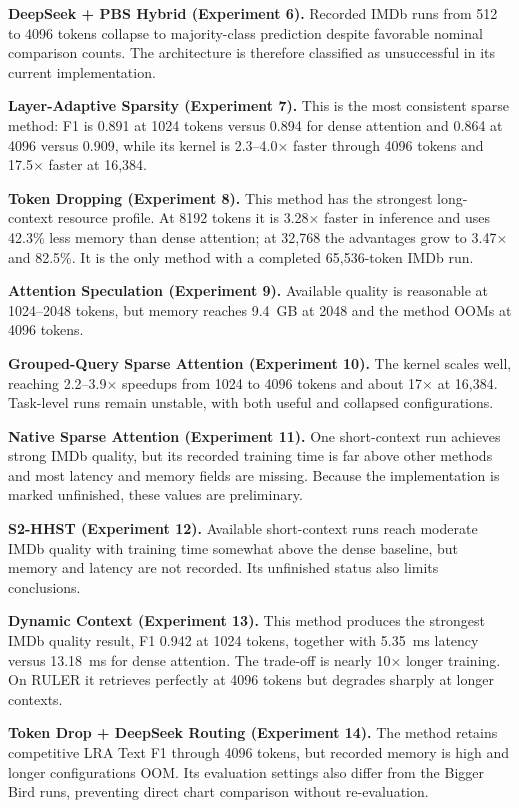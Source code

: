 \documentclass[11pt]{article}
\begin{document}
\textbf{DeepSeek + PBS Hybrid (Experiment 6).} Recorded IMDb runs from 512 to
4096 tokens collapse to majority-class prediction despite favorable nominal
comparison counts. The architecture is therefore classified as unsuccessful
in its current implementation.

\textbf{Layer-Adaptive Sparsity (Experiment 7).} This is the most consistent
sparse method: F1 is 0.891 at 1024 tokens versus 0.894 for dense attention and
0.864 at 4096 versus 0.909, while its kernel is 2.3--4.0$\times$ faster through
4096 tokens and 17.5$\times$ faster at 16{,}384.

\textbf{Token Dropping (Experiment 8).} This method has the strongest
long-context resource profile. At 8192 tokens it is 3.28$\times$ faster in
inference and uses 42.3\% less memory than dense attention; at 32{,}768 the
advantages grow to 3.47$\times$ and 82.5\%. It is the only method with a
completed 65{,}536-token IMDb run.

\textbf{Attention Speculation (Experiment 9).} Available quality is
reasonable at 1024--2048 tokens, but memory reaches 9.4~GB at 2048 and the
method OOMs at 4096 tokens.

\textbf{Grouped-Query Sparse Attention (Experiment 10).} The kernel scales
well, reaching 2.2--3.9$\times$ speedups from 1024 to 4096 tokens and about
17$\times$ at 16{,}384. Task-level runs remain unstable, with both useful and
collapsed configurations.

\textbf{Native Sparse Attention (Experiment 11).} One short-context run
achieves strong IMDb quality, but its recorded training time is far above
other methods and most latency and memory fields are missing. Because the
implementation is marked unfinished, these values are preliminary.

\textbf{S2-HHST (Experiment 12).} Available short-context runs reach moderate
IMDb quality with training time somewhat above the dense baseline, but memory
and latency are not recorded. Its unfinished status also limits conclusions.

\textbf{Dynamic Context (Experiment 13).} This method produces the strongest
IMDb quality result, F1 0.942 at 1024 tokens, together with 5.35~ms latency
versus 13.18~ms for dense attention. The trade-off is nearly 10$\times$ longer
training. On RULER it retrieves perfectly at 4096 tokens but degrades sharply
at longer contexts.

\textbf{Token Drop + DeepSeek Routing (Experiment 14).} The method retains
competitive LRA Text F1 through 4096 tokens, but recorded memory is high and
longer configurations OOM. Its evaluation settings also differ from the
Bigger Bird runs, preventing direct chart comparison without re-evaluation.
\end{document}
